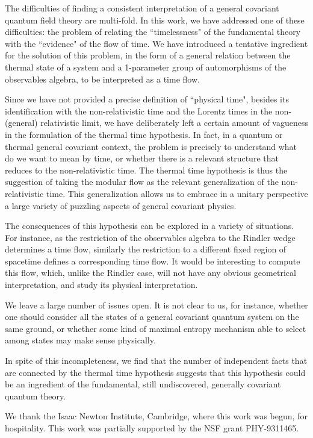 The difficulties of finding a consistent interpretation of a
general covariant quantum field theory are multi-fold.  In this
work, we have addressed one of these difficulties: the problem of
relating the ``timelessness" of the fundamental theory with the
``evidence" of the flow of time.  We have introduced a tentative
ingredient for the solution of this problem, in the form of a
general relation between the thermal state of a system and a
1-parameter group of automorphisms of the observables algebra,
to be interpreted as a time flow.

Since we have not provided a precise definition of ``physical
time", besides its identification with the non-relativistic time
and the Lorentz times in the non-(general) relativistic limit, we
have deliberately left a certain amount of vagueness in the
formulation of the thermal time hypothesis.  In fact, in a quantum
or thermal general covariant context, the problem is precisely to
understand what do we want to mean by time, or whether there is
a relevant structure that reduces to the non-relativistic time.
The thermal time hypothesis is thus the suggestion of taking the
modular flow as the relevant generalization of the
non-relativistic time.  This generalization allows us to embrace
in a unitary perspective a large variety of puzzling aspects of
general covariant physics.

The consequences of this hypothesis can be explored in a variety
of situations.  For instance, as the restriction of the observables
algebra to the Rindler wedge determines a time flow, similarly
the restriction to a different fixed region of spacetime
defines a corresponding time flow.  It would be interesting to
compute this flow, which, unlike the Rindler case, will not have
any obvious geometrical interpretation, and study its physical
interpretation.

We leave a large number of issues open.  It is not clear to us, for
instance, whether one should consider all the states of a general
covariant quantum system on the same ground, or whether some
kind of maximal entropy mechanism able to select among states
may make sense physically.

In spite of this incompleteness, we find that the number of
independent facts that are connected by the thermal time
hypothesis suggests that this hypothesis could be an ingredient of
the fundamental, still undiscovered, generally covariant quantum
theory.

\vskip1cm
We thank the Isaac Newton Institute, Cambridge, where this work
was begun, for hospitality.
This work was partially supported by the NSF grant PHY-9311465.

